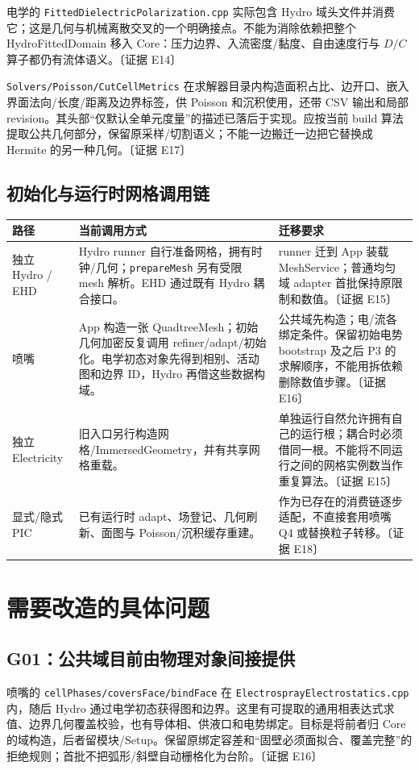 \documentclass[UTF8,a4paper,11pt,fontset=fandol]{ctexart}
\newcommand{\code}[1]{\nolinkurl{#1}}
\newcommand{\ev}[1]{{\small\color{muted}〔证据 #1〕}}
\begin{document}
电学的 \code{FittedDielectricPolarization.cpp} 实际包含 Hydro 域头文件并消费它；这是几何与机械离散交叉的一个明确接点。不能为消除依赖把整个 HydroFittedDomain 移入 Core：压力边界、入流密度/黏度、自由速度行与 $D/C$ 算子都仍有流体语义。\ev{E14}

\code{Solvers/Poisson/CutCellMetrics} 在求解器目录内构造面积占比、边开口、嵌入界面法向/长度/距离及边界标签，供 Poisson 和沉积使用，还带 CSV 输出和局部 revision。其头部“仅默认全单元度量”的描述已落后于实现。应按当前 build 算法提取公共几何部分，保留原采样/切割语义；不能一边搬迁一边把它替换成 Hermite 的另一种几何。\ev{E17}

\subsection{初始化与运行时网格调用链}
\begin{longtable}{@{}P{.2\textwidth}P{.44\textwidth}P{.3\textwidth}@{}}
\toprule 路径 & 当前调用方式 & 迁移要求\\\midrule\endhead
独立 Hydro / EHD & Hydro runner 自行准备网格，拥有时钟/几何；\code{prepareMesh} 另有受限 mesh 解析。EHD 通过既有 Hydro 耦合接口。 & runner 迁到 App 装载 MeshService；普通均匀域 adapter 首批保持原限制和数值。\ev{E15}\\
喷嘴 & App 构造一张 QuadtreeMesh；初始几何加密反复调用 refiner/adapt/初始化。电学初态对象先得到相别、活动图和边界 ID，Hydro 再借这些数据构域。 & 公共域先构造；电/流各绑定条件。保留初始电势 bootstrap 及之后 P3 的求解顺序，不能用拆依赖删除数值步骤。\ev{E16}\\
独立 Electricity & 旧入口另行构造网格/ImmersedGeometry，并有共享网格重载。 & 单独运行自然允许拥有自己的运行根；耦合时必须借同一根。不能将不同运行之间的网格实例数当作重复算法。\ev{E15}\\
显式/隐式 PIC & 已有运行时 adapt、场登记、几何刷新、面图与 Poisson/沉积缓存重建。 & 作为已存在的消费链逐步适配，不直接套用喷嘴 Q4 或替换粒子转移。\ev{E18}\\
\bottomrule
\end{longtable}

\section{需要改造的具体问题}
\subsection{G01：公共域目前由物理对象间接提供}
喷嘴的 \code{cellPhases/coversFace/bindFace} 在 \code{ElectrosprayElectrostatics.cpp} 内，随后 Hydro 通过电学初态获得图和边界。这里有可提取的通用相表达式求值、边界几何覆盖校验，也有导体相、供液口和电势绑定。目标是将前者归 Core 的域构造，后者留模块/Setup。保留原绑定容差和“固壁必须面拟合、覆盖完整”的拒绝规则；首批不把弧形/斜壁自动栅格化为台阶。\ev{E16}
\end{document}
